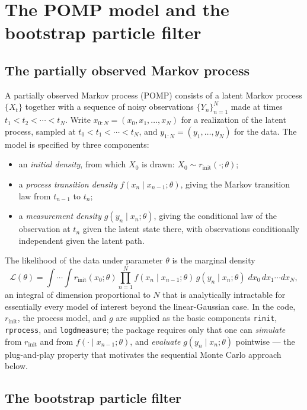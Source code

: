 \documentclass[11pt]{article}
\begin{document}
\tableofcontents

\section{The POMP model and the bootstrap particle filter}

\subsection{The partially observed Markov process}

A partially observed Markov process (POMP) consists of a latent Markov process
$\{X_t\}$ together with a sequence of noisy observations $\{Y_n\}_{n=1}^N$ made
at times $t_1 < t_2 < \cdots < t_N$. Write $x_{0:N} = (x_0,x_1,\dots,x_N)$ for a
realization of the latent process, sampled at $t_0 < t_1 < \cdots < t_N$, and
$y_{1:N}=(y_1,\dots,y_N)$ for the data. The model is specified by three
components:

\begin{itemize}
\item an \emph{initial density}, from which $X_0$ is drawn: $X_0 \sim r_{\mathrm{init}}(\cdot;\theta)$;
\item a \emph{process transition density} $f(x_n \mid x_{n-1};\theta)$, giving the
Markov transition law from $t_{n-1}$ to $t_n$;
\item a \emph{measurement density} $g(y_n \mid x_n;\theta)$, giving the conditional
law of the observation at $t_n$ given the latent state there, with observations
conditionally independent given the latent path.
\end{itemize}

The likelihood of the data under parameter $\theta$ is the marginal density
\[
\mathcal{L}(\theta) = \int \cdots \int r_{\mathrm{init}}(x_0;\theta)
\prod_{n=1}^N f(x_n\mid x_{n-1};\theta)\, g(y_n\mid x_n;\theta) \; dx_0\, dx_1 \cdots dx_N,
\]
an integral of dimension proportional to $N$ that is analytically intractable for
essentially every model of interest beyond the linear-Gaussian case. In the code,
$r_{\mathrm{init}}$, the process model, and $g$ are supplied as the basic
components \verb|rinit|, \verb|rprocess|, and \verb|logdmeasure|; the package
requires only that one can \emph{simulate} from $r_{\mathrm{init}}$ and from
$f(\cdot\mid x_{n-1};\theta)$, and \emph{evaluate} $g(y_n\mid x_n;\theta)$
pointwise — the plug-and-play property that motivates the sequential Monte Carlo
approach below.

\subsection{The bootstrap particle filter}
\end{document}
